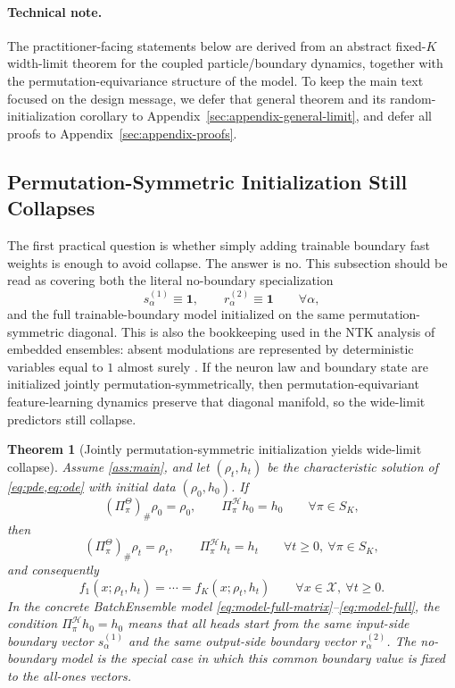 \documentclass[11pt]{article}
\newtheorem{theorem}{Theorem}[section]
\theoremstyle{definition}
\begin{document}
\paragraph{Technical note.}
The practitioner-facing statements below are derived from an abstract fixed-$K$
width-limit theorem for the coupled particle/boundary dynamics, together with
the permutation-equivariance structure of the model. To keep the main text
focused on the design message, we defer that general theorem and its
random-initialization corollary to Appendix~\ref{sec:appendix-general-limit},
and defer all proofs to Appendix~\ref{sec:appendix-proofs}.

\subsection{Permutation-Symmetric Initialization Still Collapses}
\label{sec:regime-a}

The first practical question is whether simply adding trainable boundary fast
weights is enough to avoid collapse. The answer is no. This subsection should
be read as covering both the literal no-boundary specialization
\[
  s_\alpha^{(1)}\equiv \mathbf 1,
  \qquad
  r_\alpha^{(2)}\equiv \mathbf 1
  \qquad
  \forall \alpha,
\]
and the full trainable-boundary model initialized on the same permutation-
symmetric diagonal. This is also the bookkeeping used in the NTK analysis of
embedded ensembles: absent modulations are represented by deterministic
variables equal to $1$ almost surely \cite{velikanov2022}. If the neuron law
and boundary state are initialized jointly permutation-symmetrically, then
permutation-equivariant feature-learning dynamics preserve that diagonal
manifold, so the wide-limit predictors still collapse.

\begin{theorem}[Jointly permutation-symmetric initialization yields wide-limit collapse]
\label{thm:identical-boundary-collapse}
Assume \cref{ass:main}, and let $(\rho_t,h_t)$ be the characteristic solution of
\cref{eq:pde,eq:ode} with initial data $(\rho_0,h_0)$. If
\[
  (\Pi_\pi^\Theta)_\#\rho_0=\rho_0,
  \qquad
  \Pi_\pi^\mathcal H h_0=h_0
  \qquad
  \forall \pi\in S_K,
\]
then
\[
  (\Pi_\pi^\Theta)_\#\rho_t=\rho_t,
  \qquad
  \Pi_\pi^\mathcal H h_t=h_t
  \qquad
  \forall t\ge 0,\ \forall \pi\in S_K,
\]
and consequently
\[
  f_1(x;\rho_t,h_t)=\cdots=f_K(x;\rho_t,h_t)
  \qquad
  \forall x\in\mathcal X,\ \forall t\ge 0.
\]
In the concrete BatchEnsemble model
\eqref{eq:model-full-matrix}--\eqref{eq:model-full}, the condition
$\Pi_\pi^\mathcal H h_0=h_0$ means that all heads start from the same
input-side boundary vector $s_\alpha^{(1)}$ and the same output-side boundary
vector $r_\alpha^{(2)}$. The no-boundary model is the special case in which
this common boundary value is fixed to the all-ones vectors.
\end{theorem}
\end{document}
